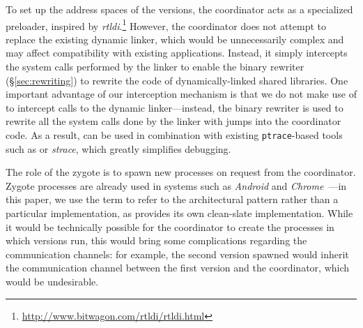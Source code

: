 

  To set up the address spaces of the versions,
the coordinator acts as a specialized preloader, inspired by
\emph{rtldi}.\footnote{\url{http://www.bitwagon.com/rtldi/rtldi.html}}
However, the coordinator does not attempt to replace the existing
dynamic linker, which would be unnecessarily complex and may affect
compatibility with existing applications. Instead, it simply
intercepts the system calls performed by the linker to enable the
binary rewriter (\S\ref{sec:rewriting}) to rewrite the code of
dynamically-linked shared libraries.  One important advantage of our
interception mechanism is that we do not make use of \ptrace to
intercept calls to the dynamic linker---instead, the binary rewriter
is used to rewrite all the system calls done by the linker with jumps
into the coordinator code.  As a result, \varan can be used in
combination with existing \lstinline`ptrace`-based tools such as \gdb
or \textit{strace}, which greatly simplifies debugging.





 The role of the zygote is to spawn new processes on
request from the coordinator.  Zygote processes are already used in
systems such as \textit{Android} and
\textit{Chrome}~\cite{linuxzygote}---in this paper, we use the term to
refer to the architectural pattern rather than a particular implementation, as \varan
provides its own clean-slate implementation.  While it would be
technically possible for the coordinator to create the processes in
which versions run, this would bring some complications regarding the
communication channels: for example, the second version spawned would
inherit the communication channel between the first version and the
coordinator, which would be undesirable.

